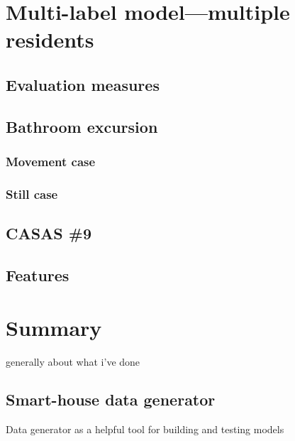 \documentclass[12pt, a4paper, pdflatex, leqno, twoside, openright]{report}
\begin{document}
\chapter{Multi-label model---multiple residents\label{ch:mlm}}
  \section{Evaluation measures}
  \section{Bathroom excursion}
    \subsection{Movement case}
    \subsection{Still case}

  \section{CASAS \#9}

  \section{Features}


\chapter{Summary\label{ch:summary}}
generally about what i've done

  \section{Smart-house data generator}
Data generator as a helpful tool for building and testing models\\
\end{document}
